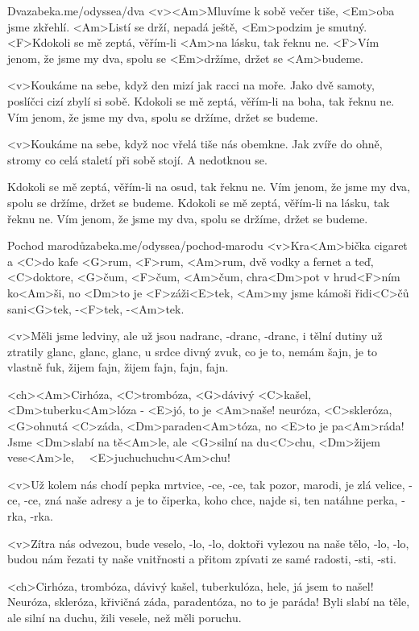 \begin{song}[Zrní]{64}{Dva}{zabeka.me/odyssea/dva}
	<v><Am>Mluvíme k sobě večer tiše,
	<Em>oba jsme zkřehlí.
	<Am>Listí se drží, nepadá ještě,
	<Em>podzim je smutný.
	<F>Kdokoli se mě zeptá, věřím-li <Am>na lásku, tak řeknu ne.
	<F>Vím jenom, že jsme my dva, spolu se <Em>držíme,
	držet se <Am>budeme.

	<v>Koukáme na sebe, když den mizí
	jak racci na moře.
	Jako dvě samoty, poslíčci cizí
	zbylí si sobě.
	Kdokoli se mě zeptá, věřím-li na boha, tak řeknu ne.
	Vím jenom, že jsme my dva, spolu se držíme,
	držet se budeme.

	<v>Koukáme na sebe, když noc vřelá
	tiše nás obemkne.
	Jak zvíře do ohně, stromy co celá
	staletí při sobě stojí.
	A nedotknou se.

	Kdokoli se mě zeptá, věřím-li na osud, tak řeknu ne.
	Vím jenom, že jsme my dva, spolu se držíme,
	držet se budeme.
	Kdokoli se mě zeptá, věřím-li na lásku, tak řeknu ne.
	Vím jenom, že jsme my dva, spolu se držíme,
	držet se budeme.
\end{song}
\begin{song}{65}{Pochod marodů}{zabeka.me/odyssea/pochod-marodu}
	<v>Kra<Am>bička cigaret a <C>do kafe <G>rum, <F>rum, <Am>rum,
	dvě vodky a fernet a teď, <C>doktore, <G>čum, <F>čum, <Am>čum,
	chra<Dm>pot v hrud<F>ním ko<Am>ši, no <Dm>to je <F>záži<E>tek,
	<Am>my jsme kámoši řidi<C>čů sani<G>tek, -<F>tek, -<Am>tek.

	<v>Měli jsme ledviny, ale už jsou nadranc, -dranc, -dranc,
	i tělní dutiny už ztratily glanc, glanc, glanc,
	u srdce divný zvuk, co je to, nemám šajn,
	je to vlastně fuk, žijem fajn, žijem fajn, fajn, fajn.

	<ch><Am>Cirhóza, <C>trombóza, <G>dávivý <C>kašel,
	<Dm>tuberku<Am>lóza - <E>jó, to je <Am>naše!
	neuróza, <C>skleróza, <G>ohnutá <C>záda,
	<Dm>paraden<Am>tóza, no <E>to je pa<Am>ráda!
	Jsme <Dm>slabí na tě<Am>le, ale <G>silní na du<C>chu,
	<Dm>žijem vese<Am>le, \ \ <E>juchuchuchu<Am>chu!

	<v>Už kolem nás chodí pepka mrtvice, -ce, -ce,
	tak pozor, marodi, je zlá velice, -ce, -ce,
	zná naše adresy a je to čiperka,
	koho chce, najde si, ten natáhne perka, -rka, -rka.

	<v>Zítra nás odvezou, bude veselo, -lo, -lo,
	doktoři vylezou na naše tělo, -lo, -lo,
	budou nám řezati ty naše vnitřnosti
	a přitom zpívati ze samé radosti, -sti, -sti.

	<ch>Cirhóza, trombóza, dávivý kašel,
	tuberkulóza, hele, já jsem to našel!
	Neuróza, skleróza, křivičná záda,
	paradentóza, no to je paráda!
	Byli slabí na těle, ale silní na duchu,
	žili vesele, než měli poruchu.

\end{song}
